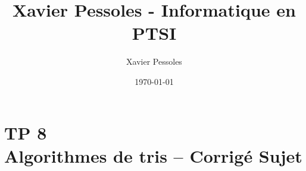 \documentclass[
	fontsize=10pt, %
	twoside=true, %
]{kaobook}
\newcommand{\repRel}{../../../..}
\newcommand{\repStyle}{\repRel/Style}
\begin{document}

\titlehead{Xavier Pessoles - Informatique en PTSI}
\title[Xavier Pessoles - Informatique en PTSI]{Xavier Pessoles - Informatique en PTSI}
\author[XP]{Xavier Pessoles}
\date{\today}


\begingroup %
\endgroup

%
\mainmatter %
%
%
%
%


\setcounter{margintocdepth}{\sectiontocdepth}
\marginlayout
\graphicspath{{\repStyle/png}}

\pagestyle{xp.scrheadings}


%



\newcommand{\repExo}{}
\newcommand{\nomExo}{}

\livrettrue %
\livrettrue
\colletrue








\chapter*{TP 8 \\ 
Algorithmes de tris -- \ifprof Corrigé \else Sujet \fi}
\end{document}
